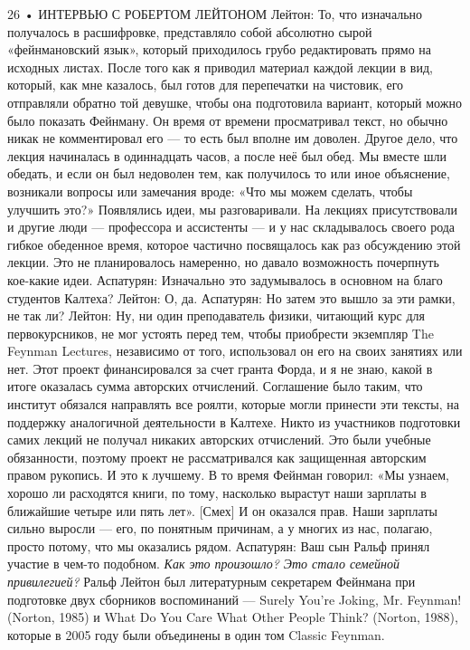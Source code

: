 \documentclass[10pt,oneside]{article}
\begin{document}
26 • ИНТЕРВЬЮ С РОБЕРТОМ ЛЕЙТОНОМ Лейтон: То, что изначально получалось в расшифровке, представляло собой абсолютно сырой «фейнмановский язык», который приходилось грубо редактировать прямо на исходных листах. После того как я приводил материал каждой лекции в вид, который, как мне казалось, был готов для перепечатки на чистовик, его отправляли обратно той девушке, чтобы она подготовила вариант, который можно было показать Фейнману. Он время от времени просматривал текст, но обычно никак не комментировал его --- то есть был вполне им доволен. Другое дело, что лекция начиналась в одиннадцать часов, а после неё был обед. Мы вместе шли обедать, и если он был недоволен тем, как получилось то или иное объяснение, возникали вопросы или замечания вроде: «Что мы можем сделать, чтобы улучшить это?» Появлялись идеи, мы разговаривали. На лекциях присутствовали и другие люди --- профессора и ассистенты --- и у нас складывалось своего рода гибкое обеденное время, которое частично посвящалось как раз обсуждению этой лекции. Это не планировалось намеренно, но давало возможность почерпнуть кое-какие идеи. Аспатурян: Изначально это задумывалось в основном на благо студентов Калтеха? Лейтон: О, да. Аспатурян: Но затем это вышло за эти рамки, не так ли? Лейтон: Ну, ни один преподаватель физики, читающий курс для первокурсников, не мог устоять перед тем, чтобы приобрести экземпляр The Feynman Lectures, независимо от того, использовал он его на своих занятиях или нет. Этот проект финансировался за счет гранта Форда, и я не знаю, какой в итоге оказалась сумма авторских отчислений. Соглашение было таким, что институт обязался направлять все роялти, которые могли принести эти тексты, на поддержку аналогичной деятельности в Калтехе. Никто из участников подготовки самих лекций не получал никаких авторских отчислений. Это были учебные обязанности, поэтому проект не рассматривался как защищенная авторским правом рукопись. И это к лучшему. В то время Фейнман говорил: «Мы узнаем, хорошо ли расходятся книги, по тому, насколько вырастут наши зарплаты в ближайшие четыре или пять лет». [Смех] И он оказался прав. Наши зарплаты сильно выросли --- его, по понятным причинам, а у многих из нас, полагаю, просто потому, что мы оказались рядом. Аспатурян: Ваш сын Ральф принял участие в чем-то подобном.\emph{ Как это произошло? Это стало семейной привилегией? } Ральф Лейтон был литературным секретарем Фейнмана при подготовке двух сборников воспоминаний --- Surely You’re Joking, Mr. Feynman! (Norton, 1985) и What Do You Care What Other People Think? (Norton, 1988), которые в 2005 году были объединены в один том Classic Feynman.\par
\end{document}
